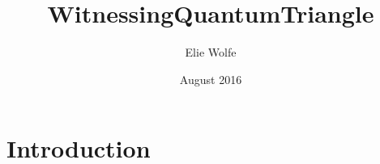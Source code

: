 \documentclass{article}
\title{WitnessingQuantumTriangle}
\author{Elie Wolfe}
\date{August 2016}
\begin{document}
\maketitle

\section{Introduction}
\end{document}

